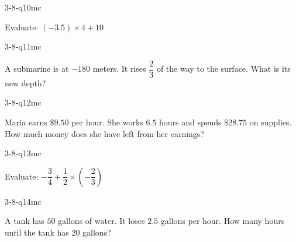 \begin{practiceQuestion}{3-8-q10}{mc}
\begin{questionText}
Evaluate: $(-3.5) \times 4 + 10$
\end{questionText}
\end{practiceQuestion}

\begin{practiceQuestion}{3-8-q11}{mc}
\begin{questionText}
A submarine is at $-180$ meters. It rises $\dfrac{2}{3}$ of the way to the surface. What is its new depth?
\end{questionText}
\end{practiceQuestion}

\begin{practiceQuestion}{3-8-q12}{mc}
\begin{questionText}
Maria earns $\$9.50$ per hour. She works $6.5$ hours and spends $\$28.75$ on supplies. How much money does she have left from her earnings?
\end{questionText}
\end{practiceQuestion}

\begin{practiceQuestion}{3-8-q13}{mc}
\begin{questionText}
Evaluate: $-\dfrac{3}{4} + \dfrac{1}{2} \times \left(-\dfrac{2}{3}\right)$
\end{questionText}
\end{practiceQuestion}

\begin{practiceQuestion}{3-8-q14}{mc}
\begin{questionText}
A tank has $50$ gallons of water. It loses $2.5$ gallons per hour. How many hours until the tank has $20$ gallons?
\end{questionText}
\end{practiceQuestion}

